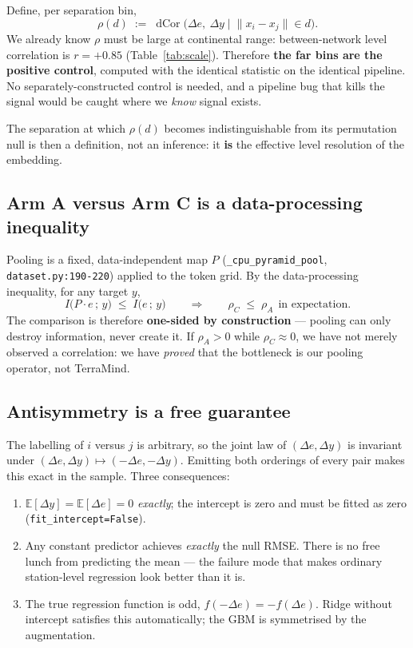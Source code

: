 \documentclass[11pt,a4paper]{article}
\newcommand{\dcor}{\operatorname{dCor}}
\newcommand{\E}{\mathbb{E}}
\begin{document}
Define, per separation bin,
\begin{equation}
  \rho(d) \;:=\; \dcor\big(\Delta e,\ \Delta y \;\big|\; \lVert x_i - x_j \rVert \in d\big).
\end{equation}
We already know $\rho$ must be large at continental range: between-network level
correlation is $r = +0.85$ (Table~\ref{tab:scale}). Therefore
\textbf{the far bins are the positive control}, computed with the identical statistic on
the identical pipeline. No separately-constructed control is needed, and a pipeline bug
that kills the signal would be caught where we \emph{know} signal exists.

The separation at which $\rho(d)$ becomes indistinguishable from its permutation null is
then a definition, not an inference: it \textbf{is} the effective level resolution of the
embedding.

\subsection{Arm A versus Arm C is a data-processing inequality}

Pooling is a fixed, data-independent map $P$ (\verb|_cpu_pyramid_pool|,
\verb|dataset.py:190-220|) applied to the token grid. By the data-processing inequality,
for any target $y$,
\begin{equation}
  I\big(P\!\cdot\!e \,;\, y\big) \;\le\; I\big(e \,;\, y\big)
  \qquad\Longrightarrow\qquad \rho_C \;\le\; \rho_A \ \ \text{in expectation.}
\end{equation}
The comparison is therefore \textbf{one-sided by construction} --- pooling can only
destroy information, never create it. If $\rho_A > 0$ while $\rho_C \approx 0$, we have
not merely observed a correlation: we have \emph{proved} that the bottleneck is our
pooling operator, not TerraMind.

\subsection{Antisymmetry is a free guarantee}

The labelling of $i$ versus $j$ is arbitrary, so the joint law of $(\Delta e, \Delta y)$ is
invariant under $(\Delta e, \Delta y) \mapsto (-\Delta e, -\Delta y)$. Emitting both
orderings of every pair makes this exact in the sample. Three consequences:
\begin{enumerate}[nosep]
  \item $\E[\Delta y] = \E[\Delta e] = 0$ \emph{exactly}; the intercept is zero and must be
        fitted as zero (\verb|fit_intercept=False|).
  \item Any constant predictor achieves \emph{exactly} the null RMSE. There is no free
        lunch from predicting the mean --- the failure mode that makes ordinary
        station-level regression look better than it is.
  \item The true regression function is odd, $f(-\Delta e) = -f(\Delta e)$. Ridge without
        intercept satisfies this automatically; the GBM is symmetrised by the augmentation.
\end{enumerate}
\end{document}
